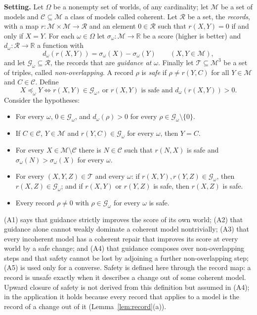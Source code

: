 \documentclass[11pt]{article}
\newcommand{\R}{\mathbb{R}}
\newcommand{\M}{\mathcal{M}}
\newcommand{\CC}{\mathcal{C}}
\theoremstyle{plain}
\theoremstyle{definition}
\theoremstyle{remark}
\begin{document}
\smallskip\noindent\textbf{Setting.} Let $\Omega$ be a nonempty set of worlds, of any
cardinality; let $\M$ be a set of models and $\CC\subseteq\M$ a class of models called
coherent. Let $\mathcal R$ be a set, the \emph{records}, with a map $r:\M\times\M\to
\mathcal R$ and an element $0\in\mathcal R$ such that $r(X,Y)=0$ if and only if $X=Y$.
For each $\omega\in\Omega$ let $\sigma_\omega:\M\to\R$ be a score (higher is better) and
$d_\omega:\mathcal R\to\R$ a function with
\[
  d_\omega(r(X,Y))=\sigma_\omega(X)-\sigma_\omega(Y)\qquad(X,Y\in\M),
\]
and let $\mathcal G_\omega\subseteq\mathcal R$, the records that are \emph{guidance at
$\omega$}. Finally let $\mathcal T\subseteq\M^3$ be a set of triples, called
\emph{non-overlapping}. A record $\rho$ is \emph{safe} if $\rho\ne r(Y,C)$ for all
$Y\in\M$ and $C\in\CC$. Define
\[
  X\preceq_\omega Y\iff r(X,Y)\in\mathcal G_\omega,\ \text{or $r(X,Y)$ is safe and }
  d_\omega(r(X,Y))>0 .
\]
Consider the hypotheses:
\begin{itemize}
  \item[(A1)] For every $\omega$, $0\in\mathcal G_\omega$, and $d_\omega(\rho)>0$ for every
  $\rho\in\mathcal G_\omega\setminus\{0\}$.
  \item[(A2)] If $C\in\CC$, $Y\in\M$ and $r(Y,C)\in\mathcal G_\omega$ for every $\omega$,
  then $Y=C$.
  \item[(A3)] For every $X\in\M\setminus\CC$ there is $N\in\CC$ such that $r(N,X)$ is safe
  and $\sigma_\omega(N)>\sigma_\omega(X)$ for every $\omega$.
  \item[(A4)] For every $(X,Y,Z)\in\mathcal T$ and every $\omega$: if $r(X,Y),r(Y,Z)\in
  \mathcal G_\omega$, then $r(X,Z)\in\mathcal G_\omega$; and if $r(X,Y)$ or $r(Y,Z)$ is
  safe, then $r(X,Z)$ is safe.
  \item[(A5)] Every record $\rho\ne0$ with $\rho\in\mathcal G_\omega$ for every $\omega$
  is safe.
\end{itemize}
(A1) says that guidance strictly improves the score of its own world; (A2) that guidance
alone cannot weakly dominate a coherent model nontrivially; (A3) that every incoherent
model has a coherent repair that improves its score at every world by a safe change; and
(A4) that guidance composes over non-overlapping steps and that safety cannot be lost by
adjoining a further non-overlapping step; (A5) is used only for a converse. Safety is
defined here through the record map: a record is unsafe exactly when it describes a change
out of some coherent model. Upward closure of safety is not derived from this definition
but assumed in (A4); in the application it holds because every record that applies to a
model is the record of a change out of it (Lemma~\ref{lem:record}(a)).
\end{document}
